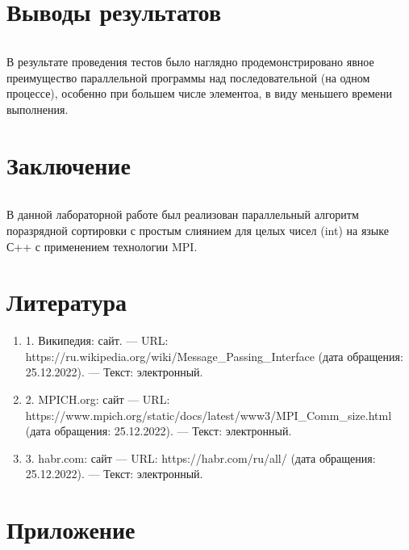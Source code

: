 \documentclass[12pt,a4paper]{article}
\begin{document}
\part*{Выводы результатов}
\paragraph{} В результате проведения тестов было наглядно продемонстрировано явное преимущество параллельной программы над последовательной (на одном процессе), особенно при большем числе элементоа, в виду меньшего времени выполнения. 

\part*{Заключение}
\paragraph{}В данной лабораторной работе был реализован параллельный алгоритм поразрядной сортировки с простым слиянием для целых чисел (int) на языке С++ с применением технологии MPI.

\part*{Литература}
\begin{enumerate} 
\item 1. Википедия: сайт. —  URL: https://ru.wikipedia.org/wiki/Message\_Passing\_Interface (дата обращения: 25.12.2022). —  Текст: электронный.
\item 2. MPICH.org: сайт —  URL: https://www.mpich.org/static/docs/latest/www3/MPI\_Comm\_size.html (дата обращения: 25.12.2022). —  Текст: электронный.
\item 3. habr.com: сайт —  URL: https://habr.com/ru/all/ (дата обращения: 25.12.2022). —  Текст: электронный.
\end{enumerate} 

\part*{Приложение}
\end{document}
